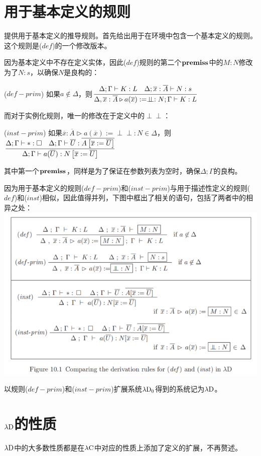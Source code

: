 \documentclass[UTF8]{article}
\newcommand{\dperp}{\perp\!\!\!\perp}
\begin{document}
	\section{用于基本定义的规则}
	\noindent
	提供用于基本定义的推导规则。首先给出用于在环境中包含一个基本定义的规则。这个规则是($def$)的一个修改版本。
	
		因为基本定义中不存在定义实体，因此($def$)规则的第二个$\bf premiss$中的$M:N$修改为了$N:s$，以确保$N$是良构的：
		
		($def-prim$) 如果$a\notin\Delta$，则$\cfrac{\Delta;\Gamma\vdash K:L\ \ \ \Delta;\overline{x}:\overline{A}\vdash N:s}  {\Delta,\overline{x}:\overline{A}\triangleright a(\overline{x}):=\dperp:N;\Gamma\vdash K:L}$
		
		而对于实例化规则，唯一的修改在于定义中的$\dperp$：
		
		($inst-prim$) 如果$\overline{x}:\overline{A}\triangleright a(\overline{x}):=\dperp:N\in\Delta$，则$\cfrac{\Delta;\Gamma\vdash*:\square\ \ \ \Delta;\Gamma\vdash\overline{U}:\overline{A\left[\overline{x}:=\overline{U}\right]}}   {\Delta;\Gamma\vdash a(\overline{U}):N\left[\overline{x}:=\overline{U}\right]}$
		
		其中第一个$\bf premiss$，同样是为了保证在参数列表为空时，确保$\Delta;\Gamma$的良构。
		
		因为用于基本定义的规则($def-prim$)和($inst-prim$)与用于描述性定义的规则($def$)和($inst$)相似，因此值得并列，下图中框出了相关的语句，包括了两者中的相异之处：\\
		\includegraphics[width=0.93\linewidth]{"../imgs/10-2.png"}
		
		以规则($def-prim$)和($inst-prim$)扩展系统$\lambda{\rm D_0}$得到的系统记为$\lambda{\rm D}$。
		
	\section{$\lambda{\rm D}$的性质}
	\noindent
	$\lambda{\rm D}$中的大多数性质都是在$\lambda{\rm C}$中对应的性质上添加了定义的扩展，不再赘述。
	
\end{document}
